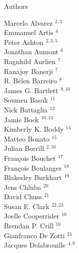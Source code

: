 \documentclass[PICOAPC.tex]{subfiles}
\begin{document}
\large  {\centerline {Authors}}
%
\footnotesize {
\begin{multicols}{4}
Marcelo Alvarez $^{2,3}$                 \\
Emmanuel Artis $^{4}$                  \\
Peter Ashton $^{2,3,5}$                    \\
Jonathan Aumont $^{6}$                 \\
Ragnhild Aurlien $^{7}$                \\
Ranajoy Banerji $^{7}$                 \\
R. Belen Barreiro $^{8}$               \\
James G. Bartlett $^{9,10}$               \\
Soumen Basak $^{11}$                    \\
Nick Battaglia $^{12}$                  \\
Jamie Bock $^{10,13}$                      \\
Kimberly K. Boddy $^{14}$               \\
Matteo Bonato $^{15}$                   \\
Julian Borrill $^{2,16}$                  \\
Fran\c{c}ois Bouchet $^{17}$            \\
Fran\c{c}ois Boulanger $^{18}$          \\
Blakesley Burkhart $^{19}$              \\
Jens Chluba $^{20}$                     \\
David Chuss $^{21}$                     \\
Susan E. Clark $^{22,23}$                  \\
Joelle Cooperrider $^{10}$              \\
Brendan P. Crill $^{10}$                \\
Gianfranco De Zotti $^{24}$             \\
Jacques Delabrouille $^{4,9}$            \\

\end{multicols}}
\end{document}

